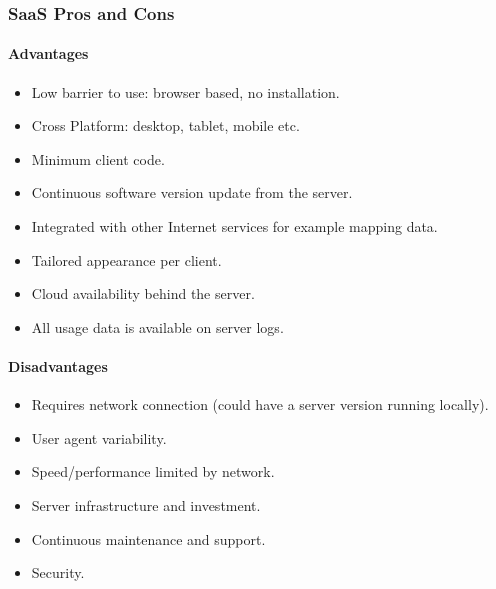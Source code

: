 \documentclass[letterpaper,10pt,english]{sphinxmanual}
\begin{document}
\subsubsection{SaaS Pros and Cons}
\label{\detokenize{tech/saas:saas-pros-and-cons}}

\paragraph{Advantages}
\label{\detokenize{tech/saas:advantages}}\begin{itemize}
\item {} 
Low barrier to use: browser based, no installation.

\item {} 
Cross Platform: desktop, tablet, mobile etc.

\item {} 
Minimum client code.

\item {} 
Continuous software version update from the server.

\item {} 
Integrated with other Internet services for example mapping data.

\item {} 
Tailored appearance per client.

\item {} 
Cloud availability behind the server.

\item {} 
All usage data is available on server logs.

\end{itemize}


\paragraph{Disadvantages}
\label{\detokenize{tech/saas:disadvantages}}\begin{itemize}
\item {} 
Requires network connection (could have a server version running locally).

\item {} 
User agent variability.

\item {} 
Speed/performance limited by network.

\item {} 
Server infrastructure and investment.

\item {} 
Continuous maintenance and support.

\item {} 
Security.

\end{itemize}
\end{document}
